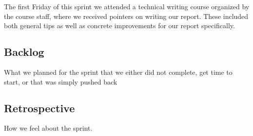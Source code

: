 The first Friday of this sprint we attended a technical writing course organized by the course staff, where we received pointers on writing our report. These included both general tips as well as concrete improvements for our report specifically.

\subsection{Backlog}
What we planned for the sprint that we either did not complete, get time to start, or that was simply pushed back

\subsection{Retrospective}
How we feel about the sprint.